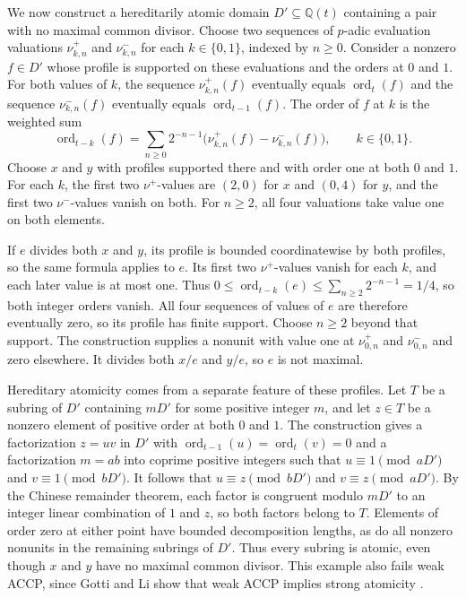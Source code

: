 \documentclass{article}
\DeclareMathOperator{\ord}{ord}
\theoremstyle{remark}
\begin{document}
We now construct a hereditarily atomic domain $D' \subseteq \mathbb{Q}(t)$ containing a pair with no maximal common divisor.
Choose two sequences of $p$-adic evaluation valuations $\nu^+_{k, n}$ and $\nu^-_{k, n}$ for each $k \in \{0, 1\}$, indexed by $n \ge 0$.
Consider a nonzero $f \in D'$ whose profile is supported on these evaluations and the orders at $0$ and $1$.
For both values of $k$, the sequence $\nu^+_{k, n}(f)$ eventually equals $\ord_t(f)$ and the sequence $\nu^-_{k, n}(f)$ eventually equals $\ord_{t - 1}(f)$.
The order of $f$ at $k$ is the weighted sum
\[
    \ord_{t - k}(f) = \sum_{n \ge 0} 2^{-n - 1}\bigl(\nu^+_{k, n}(f) - \nu^-_{k, n}(f)\bigr),
    \qquad k \in \{0, 1\}.
\]
Choose $x$ and $y$ with profiles supported there and with order one at both $0$ and $1$.
For each $k$, the first two $\nu^+$-values are $(2, 0)$ for $x$ and $(0, 4)$ for $y$, and the first two $\nu^-$-values vanish on both.
For $n \ge 2$, all four valuations take value one on both elements.

If $e$ divides both $x$ and $y$, its profile is bounded coordinatewise by both profiles, so the same formula applies to $e$.
Its first two $\nu^+$-values vanish for each $k$, and each later value is at most one.
Thus $0 \le \ord_{t - k}(e) \le \sum_{n \ge 2} 2^{-n - 1} = 1/4$, so both integer orders vanish.
All four sequences of values of $e$ are therefore eventually zero, so its profile has finite support.
Choose $n \ge 2$ beyond that support.
The construction supplies a nonunit with value one at $\nu^+_{0, n}$ and $\nu^-_{0, n}$ and zero elsewhere.
It divides both $x/e$ and $y/e$, so $e$ is not maximal.

Hereditary atomicity comes from a separate feature of these profiles.
Let $T$ be a subring of $D'$ containing $mD'$ for some positive integer $m$, and let $z \in T$ be a nonzero element of positive order at both $0$ and $1$.
The construction gives a factorization $z = uv$ in $D'$ with $\ord_{t - 1}(u) = \ord_t(v) = 0$ and a factorization $m = ab$ into coprime positive integers such that $u \equiv 1 \pmod{aD'}$ and $v \equiv 1 \pmod{bD'}$.
It follows that $u \equiv z \pmod{bD'}$ and $v \equiv z \pmod{aD'}$.
By the Chinese remainder theorem, each factor is congruent modulo $mD'$ to an integer linear combination of $1$ and $z$, so both factors belong to $T$.
Elements of order zero at either point have bounded decomposition lengths, as do all nonzero nonunits in the remaining subrings of $D'$.
Thus every subring is atomic, even though $x$ and $y$ have no maximal common divisor.
This example also fails weak ACCP, since Gotti and Li show that weak ACCP implies strong atomicity \cite[Proposition~3.10]{GL}.
\end{document}
